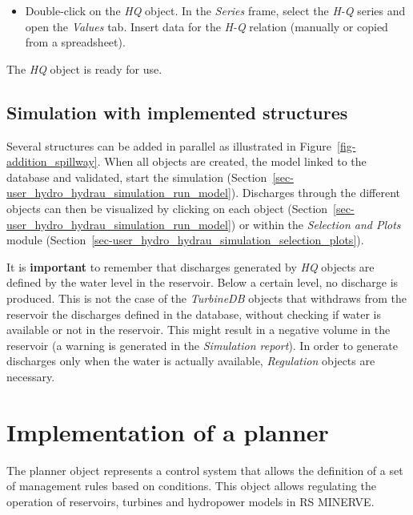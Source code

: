 \documentclass[
  letterpaper,
  DIV=11,
  numbers=noendperiod]{scrreprt}
\providecommand{\tightlist}{%
  \setlength{\itemsep}{0pt}\setlength{\parskip}{0pt}}\usepackage{longtable,booktabs,array}
\begin{document}
\begin{itemize}
\tightlist
\item
  {Double-click on the \emph{HQ} object. In the \emph{Series} frame,
  select the \emph{H-Q} series and open the \emph{Values} tab. Insert
  data for the \emph{H-Q} relation (manually or copied from a
  spreadsheet).}
\end{itemize}

The \emph{HQ} object is ready for use.

\hypertarget{simulation-with-implemented-structures}{%
\section{Simulation with implemented
structures}\label{simulation-with-implemented-structures}}

Several structures can be added in parallel as illustrated in
Figure~\ref{fig-addition_spillway}. When all objects are created, the
model linked to the database and validated, start the simulation
(Section~\ref{sec-user_hydro_hydrau_simulation_run_model}). Discharges
through the different objects can then be visualized by clicking on each
object (Section~\ref{sec-user_hydro_hydrau_simulation_run_model}) or
within the \emph{Selection and Plots} module
(Section~\ref{sec-user_hydro_hydrau_simulation_selection_plots}).

It is \textbf{important} to remember that discharges generated by
\emph{HQ} objects are defined by the water level in the reservoir. Below
a certain level, no discharge is produced. This is not the case of the
\emph{TurbineDB} objects that withdraws from the reservoir the
discharges defined in the database, without checking if water is
available or not in the reservoir. This might result in a negative
volume in the reservoir (a warning is generated in the \emph{Simulation
report}). In order to generate discharges only when the water is
actually available, \emph{Regulation} objects are necessary.

\hypertarget{sec-user_hydraulic_infrastructures_planner}{%
\chapter{Implementation of a
planner}\label{sec-user_hydraulic_infrastructures_planner}}

The planner object represents a control system that allows the
definition of a set of management rules based on conditions. This object
allows regulating the operation of reservoirs, turbines and hydropower
models in RS MINERVE.
\end{document}
